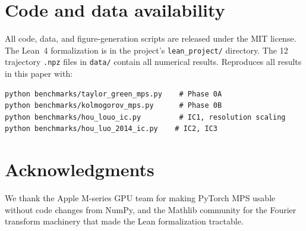 \documentclass[11pt]{article}
\begin{document}
\section*{Code and data availability}
All code, data, and figure-generation scripts are released under the MIT
license. The Lean~4 formalization is in the project's \texttt{lean\_project/}
directory. The 12 trajectory \texttt{.npz} files in \texttt{data/} contain all
numerical results. Reproduces all results in this paper with:
\begin{verbatim}
python benchmarks/taylor_green_mps.py    # Phase 0A
python benchmarks/kolmogorov_mps.py      # Phase 0B
python benchmarks/hou_louo_ic.py         # IC1, resolution scaling
python benchmarks/hou_luo_2014_ic.py    # IC2, IC3
\end{verbatim}

\section*{Acknowledgments}
We thank the Apple M-series GPU team for making PyTorch MPS usable
without code changes from NumPy, and the Mathlib community for the
Fourier transform machinery that made the Lean formalization tractable.
\end{document}
